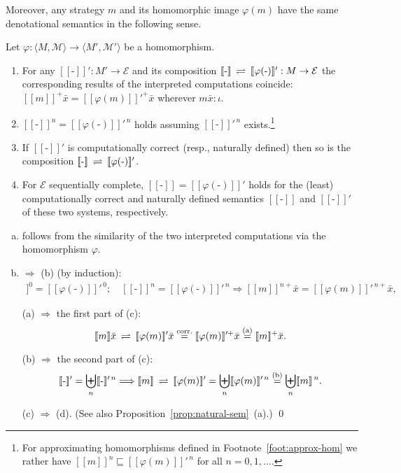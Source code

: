 \documentclass[fleqn]{LMCS}
\theoremstyle{plain}\newtheorem{satz}[thm]{Satz}
\theoremstyle{plain}\newtheorem{hyp}[thm]{Hypothesis}
\theoremstyle{plain}\newtheorem{hyps}[thm]{Hypotheses}
\theoremstyle{definition}\newtheorem{note}[thm]{Note}
\newcommand{\EE}{\mathcal{E}}
\newcommand{\defis}{\mbox{-}}
\newcommand{\bYdef}{\mathrel{\BYDEF}}
\newcommand{\BYDEF}{\mbox{$\hspace{.2em}\rightleftharpoons\hspace{.2em}$}}
\newcommand{\pointwiselub}{\biguplus}
\newcommand{\arr}{\rightarrow}
\newcommand{\Arr}{\Rightarrow}
\newcommand{\Arrr}{\Longrightarrow}
\newcommand{\la}{\langle}
\newcommand{\ra}{\rangle}
\newcommand{\Dsem}[1]{[\![ #1 ]\!]}
\newcommand{\tuple}[1]{\la #1 \ra}
\newcommand{\MM}{{\mathcal M}}
\newcommand{\bx}{\bar{x}}
\newcommand{\?}{\mbox{?}}
\begin{document}
 
Moreover, any strategy $m$ and its homomorphic image $\varphi(m)$ 
have the same denotational semantics in the following sense. 
\begin{prop}\label{prop:homomorphism-and-semantics}
Let $\varphi:\tuple{M,\MM}\arr\tuple{M',\MM'}$ be a homomorphism. 
\begin{enumerate}[\em(a)]
\item For any $\Dsem{\defis}':M'\arr\EE$ and its composition 
$\Dsem{\defis}\bYdef\Dsem{\varphi(\defis)}':M\arr\EE$
the corresponding results of 
the interpreted computations coincide: $\Dsem{m}^+\bx=\Dsem{\varphi(m)}'^+\bx$ 
wherever $m\bx:\iota$. 

\item $\Dsem{\defis}^n=\Dsem{\varphi(\defis)}'^{\,n}$ holds
assuming 
$\Dsem{\defis}'^{\,n}$ exists.\footnote{For approximating homomorphisms defined in Footnote~\ref{foot:approx-hom} 
we rather have 
$\Dsem{m}^n\sqsubseteq\Dsem{\varphi(m)}'^{\,n}$ for all $n=0,1,\ldots$.
}



\item If $\Dsem{\defis}'$ is computationally correct 
(resp., naturally defined) then so is the composition 
$\Dsem{\defis}\bYdef\Dsem{\varphi(\defis)}'$. 

\item For $\EE$ 
sequentially complete, 
$\Dsem{\defis}=\Dsem{\varphi(\defis)}'$ holds 
for the (least) computationally correct and naturally defined semantics 
$\Dsem{\defis}$ and $\Dsem{\defis}'$ of these two systems, respectively. 
\end{enumerate}
\end{prop}
\proof \hfill
\begin{enumerate}[(a)]
\item follows from the similarity of the two interpreted computations 
via the homomorphism $\varphi$.

\setcounter{enumi}{0}
\item $\Arr$ (b)
(by induction):
\begin{align*}
\Dsem{\defis}^0=\Dsem{\varphi(\defis)}'^{\,0};
\quad
\Dsem{\defis}^n=\Dsem{\varphi(\defis)}'^{\,n}\Arrr 
\Dsem{m}^{n+}\bx=\Dsem{\varphi(m)}'^{\,n+}\bx, 
\end{align*}
\setcounter{enumi}{0}
\item[(a)] $\Arr$ 
the first part of (c):
\[
\Dsem{m}\bx
\bYdef\Dsem{\varphi(m)}'\bx
\stackrel{\rm corr.}{=}\Dsem{\varphi(m)}'^+\bx
\stackrel{\rm (a)}{=}\Dsem{m}^+\bx.
\]
\item[(b)] $\Arr$ 
the second part of (c):
\[ 
\Dsem{\defis}'=\pointwiselub_n\Dsem{\defis}'^{\,n}
\Arrr\Dsem{m}\bYdef\Dsem{\varphi(m)}'
=\pointwiselub_n\Dsem{\varphi(m)}'^{\,n}
\stackrel{\rm (b)}{=}\pointwiselub_n\Dsem{m}^{\,n}.
\]
\item[(c)] $\Arr$  
(d). (See also Proposition~\ref{prop:natural-sem}~(a).)
\qed
\end{enumerate}
\end{document}
